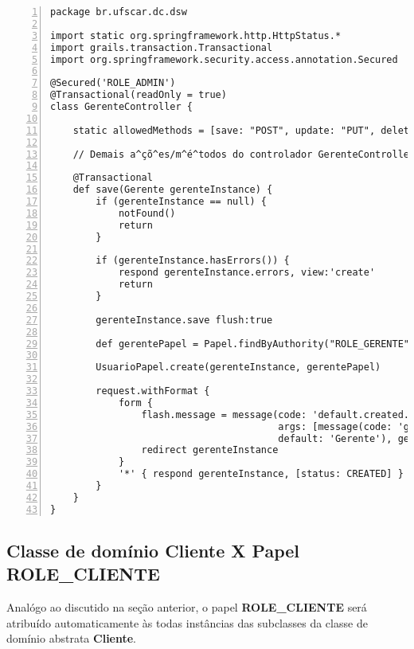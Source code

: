 \begin{lstlisting}[numbers=left,  caption=Controlador {\bf  Gerente}  (ação {\bf
      save()}), frame=trBL, float=htbp, label=codSaveGerente] 
package br.ufscar.dc.dsw

import static org.springframework.http.HttpStatus.*
import grails.transaction.Transactional
import org.springframework.security.access.annotation.Secured

@Secured('ROLE_ADMIN')
@Transactional(readOnly = true)
class GerenteController {

    static allowedMethods = [save: "POST", update: "PUT", delete: "DELETE"]

    // Demais a^çõ^es/m^é^todos do controlador GerenteController

    @Transactional
    def save(Gerente gerenteInstance) {
        if (gerenteInstance == null) {
            notFound()
            return
        }

        if (gerenteInstance.hasErrors()) {
            respond gerenteInstance.errors, view:'create'
            return
        }

        gerenteInstance.save flush:true

        def gerentePapel = Papel.findByAuthority("ROLE_GERENTE")
        
        UsuarioPapel.create(gerenteInstance, gerentePapel)
        
        request.withFormat {
            form {
                flash.message = message(code: 'default.created.message', 
                                        args: [message(code: 'gerenteInstance.label', 
                                        default: 'Gerente'), gerenteInstance.id])
                redirect gerenteInstance
            }
            '*' { respond gerenteInstance, [status: CREATED] }
        }
    }
}
\end{lstlisting}

\newpage

\subsection{Classe de domínio Cliente X Papel {\bf ROLE\_CLIENTE}}

\vspace{0.5cm}

Analógo  ao  discutido na  seção  anterior,  o  papel {\bf  ROLE\_CLIENTE}  será
atribuído  automaticamente  às todas  instâncias  das  subclasses  da classe  de
domínio abstrata {\bf Cliente}.

